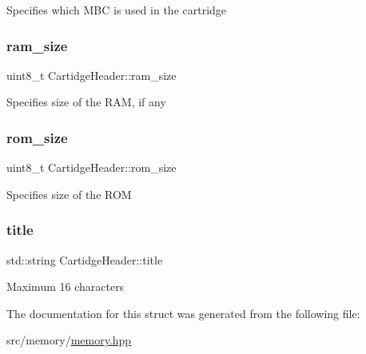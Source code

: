 Specifies which M\+BC is used in the cartridge \mbox{\label{structCartidgeHeader_aac25eb523721a21c39c24cdb3fa8c4d3}} 
\subsubsection{\texorpdfstring{ram\+\_\+size}{ram\_size}}
{\footnotesize\ttfamily uint8\+\_\+t Cartidge\+Header\+::ram\+\_\+size}

Specifies size of the R\+AM, if any \mbox{\label{structCartidgeHeader_a9c7accc3cb7f2e43e49e04cdc596f763}} 
\subsubsection{\texorpdfstring{rom\+\_\+size}{rom\_size}}
{\footnotesize\ttfamily uint8\+\_\+t Cartidge\+Header\+::rom\+\_\+size}

Specifies size of the R\+OM \mbox{\label{structCartidgeHeader_ad546e51873dc7099aee09146ccb6ac34}} 
\subsubsection{\texorpdfstring{title}{title}}
{\footnotesize\ttfamily std\+::string Cartidge\+Header\+::title}

Maximum 16 characters 

The documentation for this struct was generated from the following file\+:\begin{DoxyCompactItemize}
\item 
src/memory/\mbox{\hyperlink{memory_8hpp}{memory.\+hpp}}\end{DoxyCompactItemize}
